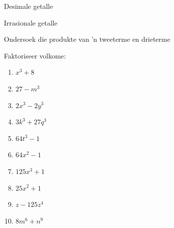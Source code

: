 \begin{Aktiwiteit}{Desimale getalle}
\begin{aktiwiteit}{Irrasionale getalle}
\begin{aktiwiteit}{Ondersoek die produkte van 'n tweeterme en drieterme}
\begin{exercises}{}
{Faktoriseer volkome:
\begin{multicols}{2}
\begin{enumerate}[itemsep=5pt, label=\textbf{\arabic*}. ] 
\item ${x}^{3}+8$
\item $27-m^{3}$
\item $2x^{3}-2y^{3}$
\item $3k^{3} + 27q^{3}$
\item $64t^{3}-1$
\item $64x^{2} -1$
\item $125x^{3} +1$
\item $25x^{2} +1$
\item $z-125z^4{}$
\item $8m^{6} + n^{9}$
\end{enumerate}
\end{multicols}

}
\end{exercises}


\end{aktiwiteit}
\end{aktiwiteit}
\end{Aktiwiteit}
